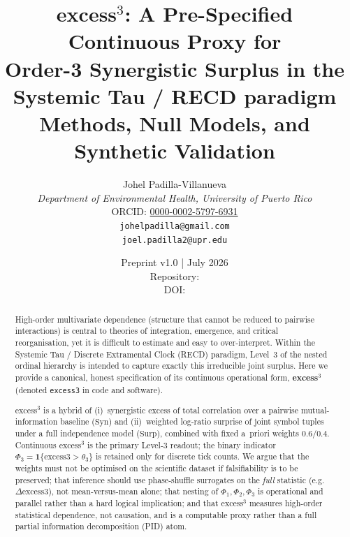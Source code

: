 \documentclass[11pt,a4paper]{article}
\title{\textbf{excess$^3$: A Pre-Specified Continuous Proxy for\\
Order-3 Synergistic Surplus in the Systemic Tau / RECD paradigm}\\[0.4em]
\large Methods, Null Models, and Synthetic Validation}
\author{
Johel Padilla-Villanueva \\
\textit{Department of Environmental Health, University of Puerto Rico} \\
ORCID: \href{https://orcid.org/0000-0002-5797-6931}{0000-0002-5797-6931} \\
\texttt{johelpadilla@gmail.com} \\
\texttt{joel.padilla2@upr.edu}
}
\date{Preprint v1.0 \quad | \quad July 2026 \\[0.25em]\small Repository: \href{\ExcessThreeRepo}{\ExcessThreeRepoShort}\\[0.15em]\small DOI: \href{\ExcessThreeDOIURL}{\ExcessThreeDOI}}
\begin{document}
\maketitle

\begin{abstract}
High-order multivariate dependence (structure that cannot be reduced to
pairwise interactions) is central to theories of integration, emergence,
and critical reorganisation, yet it is difficult to estimate and easy to
over-interpret. Within the Systemic Tau / Discrete Extramental Clock
(RECD) paradigm, Level~3 of the nested ordinal hierarchy is intended to
capture exactly this irreducible joint surplus. Here we provide a
canonical, honest specification of its continuous operational form,
\textbf{excess$^{3}$} (denoted \texttt{excess3} in code and software).

excess$^3$ is a hybrid of (i)~synergistic excess of total correlation over a
pairwise mutual-information baseline ($\mathrm{Syn}$) and (ii)~weighted
log-ratio surprise of joint symbol tuples under a full independence model
($\mathrm{Surp}$), combined with fixed a~priori weights
$0.6/0.4$. Continuous excess$^3$ is the primary Level-3 readout;
the binary indicator
$\Phi_3=\mathbf{1}\{\mathrm{excess3}>\theta_3\}$ is retained only for discrete
tick counts. We argue that the weights must not be optimised on the
scientific dataset if falsifiability is to be preserved; that inference
should use phase-shuffle surrogates on the \emph{full} statistic
(e.g.\ $\Delta\mathrm{excess3}$), not mean-versus-mean alone; that nesting of
$\Phi_1,\Phi_2,\Phi_3$ is operational and parallel rather than a hard logical
implication; and that excess$^3$ measures high-order statistical dependence,
not causation, and is a computable proxy rather than a full partial
information decomposition (PID) atom.


\end{abstract}
\end{document}
